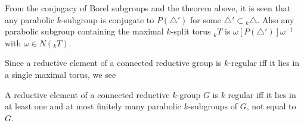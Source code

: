 From the conjugacy of Borel subgroups and the theorem above, it is
seen that any parabolic $k$-subgroup is conjugate to $P(\triangle')$
for some $\triangle' \subset {}_k \triangle$. Also any parabolic subgroup
containing the maximal $k$-split torus ${}_k T$ is $\omega
[P(\triangle')] \omega^{-1}$ with $\omega \in N({}_k T)$. 

Since a reductive element of a connected reductive group is
$k$-regular iff it lies in a single maximal torus, we see

\begin{prop}\label{chap0:prop0.16} %
  A reductive element of a connected reductive $k$-group $G$ is $k$
  regular iff it lies in at least one and at most finitely many
  parabolic $k$-subgroups of $G$, not equal to $G$.
\end{prop}
